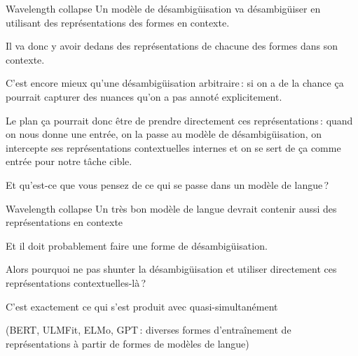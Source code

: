 \documentclass[
	xcolor={svgnames},
	aspectratio=169,
	french,
]{beamer}
\begin{document}
\begin{frame}{Wavelength collapse}
	Un modèle de désambigüisation va désambigüiser en utilisant des représentations des formes \alert{en contexte}.

	\pause

	Il va donc y avoir dedans des représentations de chacune des formes \alert{dans son contexte}.

	\pause

	C'est encore mieux qu'une désambigüisation arbitraire : si on a de la chance ça pourrait capturer des nuances qu'on a pas annoté explicitement.

	\pause

	Le plan ça pourrait donc être de prendre directement ces représentations : quand on nous donne une entrée, on la passe au modèle de désambigüisation, on intercepte ses représentations contextuelles internes et on se sert de \alert{ça} comme entrée pour notre tâche cible.

	\pause

	Et qu'est-ce que vous pensez de ce qui se passe dans un \alert{modèle de langue} ?
\end{frame}

\begin{frame}{Wavelength collapse}
	Un très bon modèle de langue devrait contenir aussi des représentations en contexte
	
	\pause
	
	Et il doit probablement faire une forme de désambigüisation.

	\pause

	Alors pourquoi ne pas shunter la désambigüisation et utiliser directement ces \alert{représentations contextuelles}-là ?

	\pause

	C'est exactement ce qui s'est produit avec quasi-simultanément \textcite{devlin2019BERTPretrainingDeep, howard2018UniversalLanguageModel, peters2018DeepContextualizedWord, radford2018ImprovingLanguageUnderstanding}

	(BERT, ULMFit, ELMo, GPT : diverses formes d'entraînement de représentations à partir de formes de modèles de langue)

\end{frame}
\end{document}
